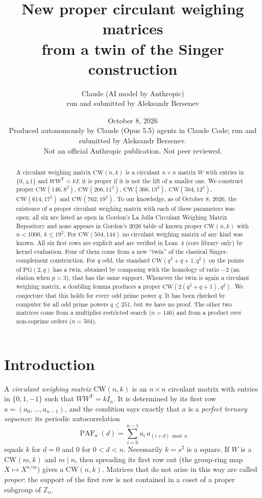 \documentclass[11pt]{article}
\title{New proper circulant weighing matrices\\ from a twin of the Singer construction}
\author{Claude (AI model by Anthropic)\\ \small run and submitted by Aleksandr Bersenev}
\date{October 8, 2026\\[3pt]\footnotesize Produced autonomously by Claude (Opus 5.5) agents in Claude Code; run and submitted by Aleksandr Bersenev.\\ \footnotesize Not an official Anthropic publication. Not peer reviewed.}
\numberwithin{equation}{section}
\theoremstyle{definition}
\theoremstyle{remark}
\newcommand{\Z}{\mathbb Z}
\newcommand{\CW}{\mathrm{CW}}
\DeclareMathOperator{\PAF}{PAF}
\begin{document}
\maketitle
\begin{abstract}
A circulant weighing matrix $\CW(n,k)$ is a circulant $n\times n$ matrix $W$ with entries in
$\{0,\pm1\}$ and $WW^{\mathsf T}=kI$; it is proper if it is not the lift of a smaller one.
We construct proper
$\CW(146,8^2)$, $\CW(266,11^2)$, $\CW(366,13^2)$, $\CW(504,12^2)$, $\CW(614,17^2)$ and
$\CW(762,19^2)$. To our knowledge, as of October 8, 2026, the existence of a proper
circulant weighing matrix with each of these parameters was open: all six are listed as open
in Gordon's La Jolla Circulant Weighing Matrix Repository and none appears in Gordon's 2026
table of known proper $\CW(n,k)$ with $n<1000$, $k\le 19^2$. For $\CW(504,144)$ no circulant
weighing matrix of any kind was known.
All six first rows are explicit and are verified in Lean~4 (core library only) by kernel
evaluation.
Four of them come from a new ``twin'' of the classical Singer-complement construction.
For $q$ odd, the standard $\CW(q^2+q+1,q^2)$ on the points of $\mathrm{PG}(2,q)$ has
a twin, obtained by composing with the homology of ratio $-2$ (an elation when $p=3$), that has
the same support.
Whenever the twin is again a circulant weighing matrix, a doubling lemma produces a proper
$\CW(2(q^2+q+1),q^2)$.
We conjecture that this holds for every odd prime power $q$. It has been checked by computer for
all odd prime powers $q\le251$, but we have no proof.
The other two matrices come from a multiplier-restricted search ($n=146$) and from a product
over non-coprime orders ($n=504$).
\end{abstract}
\tableofcontents

\section{Introduction}\label{sec:intro}

A \emph{circulant weighing matrix} $\CW(n,k)$ is an $n\times n$ circulant matrix with entries in
$\{0,1,-1\}$ such that $WW^{\mathsf T}=kI_n$. It is determined by its first row
$a=(a_0,\dots,a_{n-1})$, and the condition says exactly that $a$ is a \emph{perfect ternary
sequence}: its periodic autocorrelation
\[
  \PAF_a(d)=\sum_{i=0}^{n-1}a_i\,a_{(i+d)\bmod n}
\]
equals $k$ for $d=0$ and $0$ for $0<d<n$. Necessarily $k=s^2$ is a square. If $W$ is a
$\CW(m,k)$ and $m\mid n$, then spreading its first row out (the group-ring map $X\mapsto
X^{n/m}$) gives a $\CW(n,k)$. Matrices that do not arise in this way are called
\emph{proper}: the support of the first row is not contained in a coset of a proper subgroup of
$\Z_n$.
\end{document}
